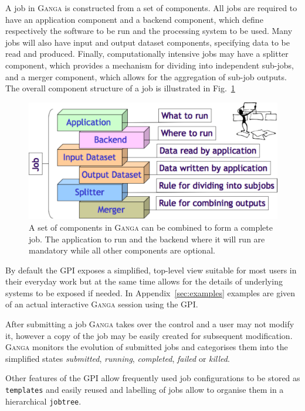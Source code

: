 \documentclass{elsart}
\def\ganga {\textsc{Ganga}\xspace}
\def\GPI{GPI\xspace}
\newcommand{\code}[1]{\texttt{#1}}
\newcommand{\val}[1]{\emph{#1}}
\begin{document}
A job in \ganga is constructed from a set of components. All jobs are
required to have an application component and a backend component, which
define respectively the software to be run and the processing system to be
used.  Many jobs will also have input and output dataset components,
specifying data to be read and produced.  Finally, computationally intensive
jobs may have a splitter component, which provides a mechanism for dividing
into independent sub-jobs, and a merger component, which allows for the
aggregation of sub-job outputs. The overall component structure of a job is
illustrated in Fig.~\ref{fig:JobComponents}
\begin{figure}
  \centering
  \includegraphics[width=14cm]{GangaJob.pdf}
  \caption{A set of components in \ganga can be combined to form a complete
    job. The application to run and the backend where it will run are
    mandatory while all other components are optional.}
  \label{fig:JobComponents}
\end{figure}

By default the \GPI exposes a simplified, top-level view suitable for most
users in their everyday work but at the same time allows for the details of
underlying systems to be exposed if needed. In Appendix~\ref{sec:examples}
examples are given of an actual interactive \ganga session using the \GPI.

After submitting a job \ganga takes over the control and a user may not modify
it, however a copy of the job may be easily created for subsequent
modification. \ganga monitors the evolution of submitted jobs and categorises
them into the simplified states \val{submitted}, \val{running},
\val{completed}, \val{failed} or \val{killed}.

Other features of the \GPI allow frequently used job configurations to be
stored as \code{templates} and easily reused and labelling of jobs allow to
organise them in a hierarchical \code{jobtree}.
\end{document}
